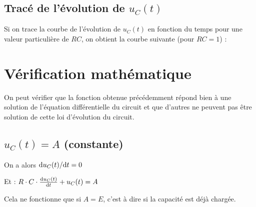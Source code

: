 \documentclass[11pt]{article} %
\begin{document}
\subsection{Tracé de l'évolution de $u_C(t)$}

Si on trace la courbe de l'évolution de $u_C(t)$ en fonction du temps pour une valeur particulière de $RC$, on obtient la courbe suivante (pour $RC = 1$) :

\begin{center}
\end{center}

\section{Vérification mathématique}

On peut vérifier que la fonction obtenue précédemment répond bien à une solution de l'équation différentielle du circuit et que d'autres ne peuvent pas être solution de cette loi d'évolution du circuit.


\subsection{$u_C(t) = A$ (constante)}

On a alors ${\rm d}u_C(t)/{\rm d}t = 0$

Et : $R \cdot C \cdot \frac{{\rm d}u_C(t)}{{\rm d}t} + u_C(t) = A$

Cela ne fonctionne que si $A = E$, c'est à dire si la capacité est déjà chargée.
\end{document}
